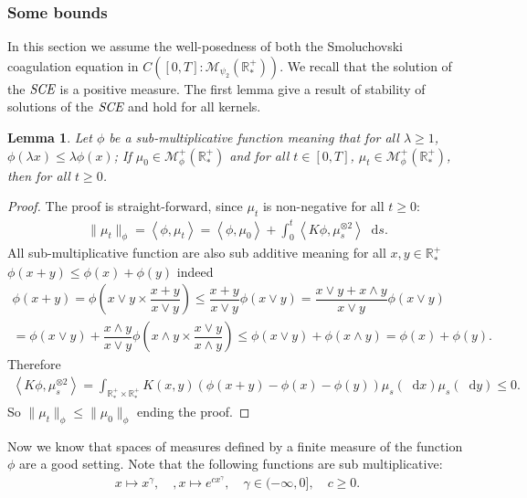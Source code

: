 \documentclass[11pt,a4paper]{article}
\newcommand{\RRP}{\mathbb{R}^+_*}
\newcommand{\MC}{\mathcal{M}}
\newcommand{\SCE}{\emph{SCE}}
\newcommand{\brac}[1]{\left\langle#1\right\rangle}
\newcommand{\dd}{\mathop{}\!\mathrm{d}}
\newtheorem{lemma}[theorem]{Lemma}
\begin{document}
\subsubsection{Some bounds}
In this section we assume the well-posedness of both the Smoluchovski coagulation equation in $C([0,T]: \MC_{\psi_2}(\RRP))$. We recall that the solution of the \(\SCE\) is a positive measure. The first lemma give a result of stability of solutions of the \(\SCE\) and hold for all kernels.
\begin{lemma}\label{lem:sub-add-bounf-smol}
    Let $\phi$ be a sub-multiplicative function meaning that for all $\lambda \geq 1$, $\phi(\lambda x) \leq \lambda \phi(x)$; If $\mu_0 \in \MC^+_{\phi}(\RRP)$ and for all $t\in[0,T]$, $\mu_t \in \MC^+_{\phi}(\RRP)$, then for all $t\geq 0$.
\end{lemma}
\begin{proof}
    The proof is straight-forward, since $\mu_t$ is non-negative for all $t\geq 0$:
    \begin{align*}
        \|\mu_t\|_{\phi} = \brac{\phi,\mu_t} = \brac{\phi,\mu_0} + \int_0^t \brac{K\phi,\mu_s^{\otimes 2}}\dd s.
    \end{align*}
    All sub-multiplicative function are also sub additive meaning for all $x,y \in \RRP$ \(\phi(x+y) \leq \phi(x) + \phi(y)\) indeed
    \begin{multline*}
        \phi(x+y) = \phi\left(x\vee y \times \dfrac{x+y}{x\vee y} \right) \leq \dfrac{x+y}{x\vee y}\phi\left(x\vee y \right) = \dfrac{x\vee y +x\wedge y}{x\vee y}\phi\left(x\vee y \right) \\
         = \phi\left(x\vee y \right) + \dfrac{x\wedge y}{x\vee y} \phi\left(x\wedge  y \times \dfrac{x\vee  y}{x\wedge  y} \right) \leq \phi\left(x\vee y \right) +  \phi\left(x\wedge  y \right) = \phi\left(x \right) +  \phi\left(y \right).
    \end{multline*}
    Therefore
    \begin{align*}
        \brac{K\phi,\mu_s^{\otimes 2}} = \int_{\RRP\times \RRP} K(x,y) \left(\phi(x+y) - \phi(x) - \phi(y)\right) \mu_s(\dd x) \mu_s (\dd y) \leq 0.
    \end{align*}
    So $ \|\mu_t\|_{\phi} \leq  \|\mu_0\|_{\phi}$ ending the proof.
\end{proof}
Now we know that spaces of measures defined by a finite measure of the function $\phi$ are a good setting. Note that the following functions are sub multiplicative:
\begin{align*}
    x \mapsto x^\gamma,\quad,x \mapsto e^{cx^\gamma},\quad  \gamma\in(-\infty,0], \quad c \geq 0. 
\end{align*}
\end{document}
